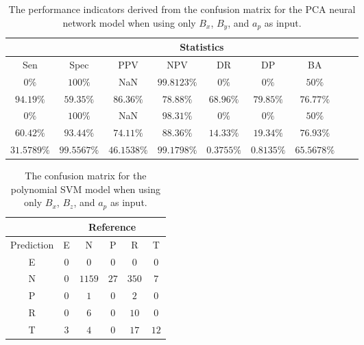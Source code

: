 \begin{table}[!ht]
	\centering
	\begin{tabular}{|c|c|c|c|c|c|c|c|c|}
		\hline
		 & \multicolumn{7}{c|}{Statistics} \\ \hline
		Sen & Spec & PPV & NPV & DR & DP & BA \\ \hline
		$0\%$ & $100\%$ & NaN & $99.8123\%$ & $0\%$ & $0\%$ & $50\%$ \\ \hline
		$94.19\%$ & $59.35\%$ & $86.36\%$ & $78.88\%$ & $68.96\%$ & $79.85\%$ & $76.77\%$ \\ \hline
		$0\%$ & $100\%$ & NaN & $98.31\%$ & $0\%$ & $0\%$ & $50\%$ \\ \hline
		$60.42\%$ & $93.44\%$ & $74.11\%$ & $88.36\%$ & $14.33\%$ & $19.34\%$ & $76.93\%$ \\ \hline
		$31.5789\%$ & $99.5567\%$ & $46.1538\%$ & $99.1798\%$ & $0.3755\%$ & $0.8135\%$ & $65.5678\%$ \\ \hline
	\end{tabular}
	\caption{The performance indicators derived from the confusion matrix for the PCA neural network model when using only $B_{x}$, $B_{y}$, and $a_{p}$ as input.}
	\label{tab:cs:xyap:pcaNNet}
\end{table}

\begin{table}[!ht]
	\centering
	\begin{tabular}{|c|c|c|c|c|c|}
		\hline
		 & \multicolumn{5}{|c|}{Reference} \\ \hline
		 Prediction & E & N & P & R & T \\ \hline
		 E & $0$ & $0$ & $0$ & $0$ & $0$ \\ \hline
		 N & $0$ & $1159$ & $27$ & $350$ & $7$ \\ \hline
		 P & $0$ & $1$ & $0$ & $2$ & $0$ \\ \hline
		 R & $0$ & $6$ & $0$ & $10$ & $0$ \\ \hline
		 T & $3$ & $4$ & $0$ & $17$ & $12$ \\ \hline
	\end{tabular}
	\caption{The confusion matrix for the polynomial SVM model when using only $B_{x}$, $B_{z}$, and $a_{p}$ as input.}
	\label{tab:cm:xzap:svmPoly}
\end{table}

